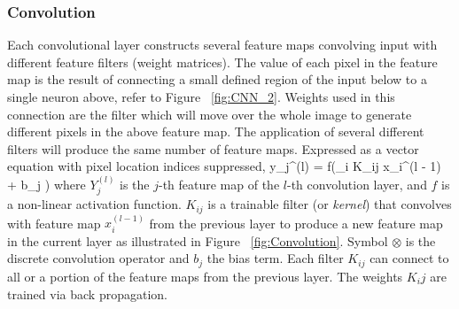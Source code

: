 \subsubsection{Convolution}
Each convolutional layer constructs several feature maps convolving input with different feature filters (weight matrices).
The value of each pixel in the feature map is the result of connecting a small defined region of the input below to a single neuron above, refer to Figure ~\ref{fig:CNN_2}.
Weights used in this connection are the filter which will move over the whole image to generate different pixels in the above feature map.
The application of several different filters will produce the same number of feature maps\citep{lecun2010convolutional}\citep{mo2012survey}.
Expressed as a vector equation with pixel location indices suppressed,
\be
y_j^{(l)} = f\left(\sum_i K_{ij} \otimes x_i^{(l - 1)} + b_j \right)
\ee
where $Y_j^{(l)}$ is the $j$-th feature map of the $l$-th convolution layer, and $f$ is a non-linear activation function\citep{lecun2010convolutional}\citep{mo2012survey}\citep{chen2014big}.
$K_{ij}$ is a trainable filter (or \textit{kernel}) that convolves with feature map $x_i^{(l - 1)}$ from the previous layer to produce a new feature map in the current layer as illustrated in Figure ~\ref{fig:Convolution}.
Symbol $\otimes$ is the discrete convolution operator and $b_j$ the bias term.
Each filter $K_{ij}$ can connect to all or a portion of the feature maps from the previous layer.
The weights $K_ij$ are trained via back propagation.

